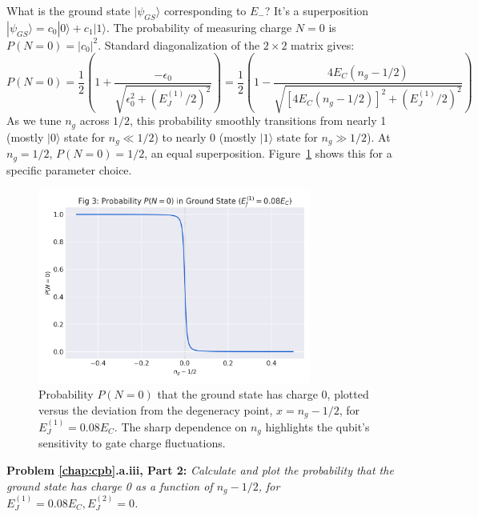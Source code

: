 \documentclass{book}
\newenvironment{problem}[1][Problem]{\par\medskip\noindent\textbf{#1:}\em}{\par\medskip}
\begin{document}
What is the ground state \(|\psi_{GS}\rangle\) corresponding to \(E_{-}\)? It's a superposition \(|\psi_{GS}\rangle = c_0 |0\rangle + c_1 |1\rangle\). The probability of measuring charge \(N=0\) is \(P(N=0) = |c_0|^2\). Standard diagonalization of the \(2\times 2\) matrix gives:
\begin{equation}
P(N=0) = \frac{1}{2} \left( 1 + \frac{-\epsilon_0}{\sqrt{\epsilon_0^2 + (E_J^{(1)}/2)^2}} \right) = \frac{1}{2} \left( 1 - \frac{4 E_C (n_g - 1/2)}{\sqrt{[4 E_C (n_g - 1/2)]^2 + (E_J^{(1)}/2)^2}} \right)
\end{equation}
As we tune \(n_g\) across \(1/2\), this probability smoothly transitions from nearly 1 (mostly \(|0\rangle\) state for \(n_g \ll 1/2\)) to nearly 0 (mostly \(|1\rangle\) state for \(n_g \gg 1/2\)). At \(n_g = 1/2\), \(P(N=0) = 1/2\), an equal superposition. Figure~\ref{fig:charge_prob} shows this for a specific parameter choice.

\begin{figure}[h]
    \centering
    \includegraphics[width=0.8\textwidth]{fig_charge_prob.png}
    \caption[Ground state charge probability near n\_g=1/2]{Probability \(P(N=0)\) that the ground state has charge 0, plotted versus the deviation from the degeneracy point, \(x = n_g - 1/2\), for \(E_J^{(1)} = 0.08 E_C\). The sharp dependence on \(n_g\) highlights the qubit's sensitivity to gate charge fluctuations.}
    \label{fig:charge_prob}
\end{figure}

\begin{problem}[Problem \ref{chap:cpb}.a.iii, Part 2]
Calculate and plot the probability that the ground state has charge 0 as a function of \(n_g - 1/2\), for \(E_J^{(1)} = 0.08 E_C, E_J^{(2)} = 0\).
\end{problem}
\end{document}
